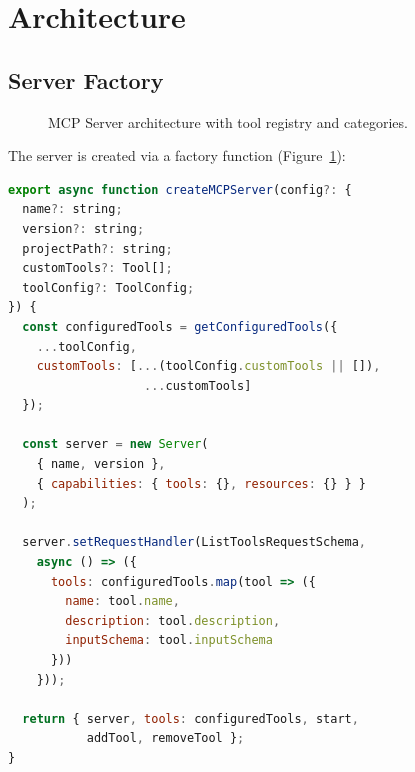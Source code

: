 \section{Architecture}


\subsection{Server Factory}

\begin{figure}[t]
\centering
{}
\caption{MCP Server architecture with tool registry and categories.}
\label{fig:arch}
\end{figure}

The server is created via a factory function (Figure~\ref{fig:arch}):

\begin{lstlisting}[language=JavaScript]
export async function createMCPServer(config?: {
  name?: string;
  version?: string;
  projectPath?: string;
  customTools?: Tool[];
  toolConfig?: ToolConfig;
}) {
  const configuredTools = getConfiguredTools({
    ...toolConfig,
    customTools: [...(toolConfig.customTools || []),
                   ...customTools]
  });

  const server = new Server(
    { name, version },
    { capabilities: { tools: {}, resources: {} } }
  );

  server.setRequestHandler(ListToolsRequestSchema,
    async () => ({
      tools: configuredTools.map(tool => ({
        name: tool.name,
        description: tool.description,
        inputSchema: tool.inputSchema
      }))
    }));

  return { server, tools: configuredTools, start,
           addTool, removeTool };
}
\end{lstlisting}

